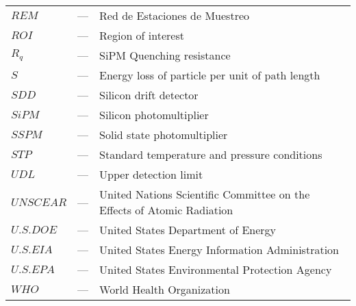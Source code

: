 \begin{longtable}{p{25mm} c p{120mm} }
$REM$ & --- & Red de Estaciones de Muestreo\\
$ROI$ & --- & Region of interest\\
$R_q$ & --- & SiPM Quenching resistance\\
$S$ & --- & Energy loss of particle per unit of path length\\
$SDD$ & --- & Silicon drift detector\\
$SiPM$ & --- & Silicon photomultiplier\\
$SSPM$ & --- & Solid state photomultiplier\\
$STP$ & --- & Standard temperature and pressure conditions\\
$UDL$ & --- & Upper detection limit\\
$UNSCEAR$ & --- & United Nations Scientific Committee on the Effects
\newline
of Atomic Radiation\\
$U.S. DOE$ & --- & United States Department of Energy\\
$U.S. EIA$ & --- & United States Energy Information Administration\\
$U.S. EPA$ & --- & United States Environmental Protection Agency\\
$WHO$ & --- & World Health Organization\\


\end{longtable}
